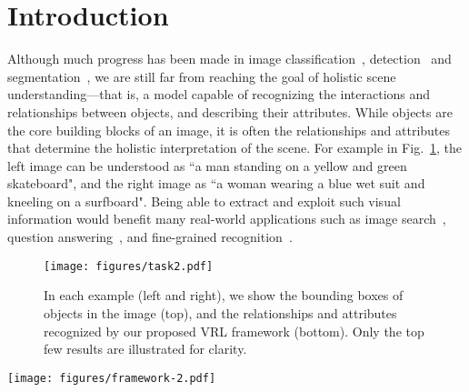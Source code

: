 \documentclass[10pt,twocolumn,letterpaper]{article}
\begin{document}
\section{Introduction}

Although much progress has been made in image classification~\cite{he2015deep}, detection~\cite{ren2015faster} and segmentation~\cite{long2015fully}, we are still far from reaching the goal of holistic scene understanding---that is, a model capable of recognizing the interactions and relationships between objects, and describing their attributes. While objects are the core building blocks of an image, it is often the relationships and attributes that determine the holistic interpretation of the scene. For example in Fig.~\ref{fig:task}, the left image can be understood as ``a man standing on a yellow and green skateboard", {and} the right image as ``a woman wearing a blue wet suit and kneeling on a surfboard". Being able to extract
and exploit such visual information would benefit many
real-world applications such as image search~\cite{qin2013query}, question answering~\cite{antol2015vqa,johnson2015densecap}, and fine-grained recognition~\cite{zhu2014reasoning, farhadi2009describing}.

\begin{figure}[!tp]
	\begin{center}
		\texttt{[image: figures/task2.pdf]}
		\caption{{In each example (left and right), we show the bounding boxes of objects in the image (top), and the relationships and attributes recognized by our proposed VRL framework (bottom). Only the top few results are illustrated for clarity.}}
		\label{fig:task}
	\end{center}
	\vspace{-8mm}
\end{figure}


\begin{figure*}[!tp]
	\begin{center}
		\texttt{[image: figures/framework-2.pdf]}
		\caption{{An overview of {the} VRL framework that sequentially detects relationships (``subject-predicate-object") and attributes (``subject-attribute"). {First, we} build a directed semantic action graph  to configure the whole action space. In each step, the {input state consists of the current subject and object instances (``sub:man'', ``obj:skateboard'') and a history phrase embedding, which captures the search paths that have already been traversed by the agent. A variation-structured traversal scheme over  dynamically constructs three small action sets , , . The agent predicts three actions: (1) , an attribute of the subject; (2) , the predicate between the subject and object; and (3) , the next object category of interest (``obj:helmet''). The new state consists of the new subject/object instances (``sub:man'', ``obj:helmet'') and an updated history phrase embedding.}}}
		\label{fig:framework}
	\end{center}
	\vspace{-8mm}
\end{figure*}
\end{document}
